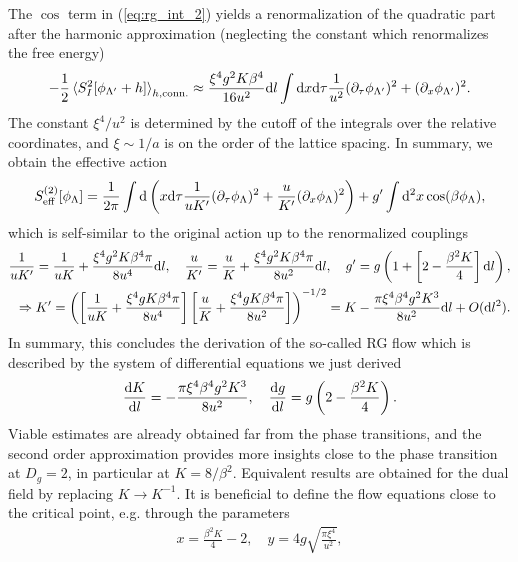 The $\cos$ term in (\cref{eq:rg_int_2}) yields a renormalization of the quadratic part after the harmonic approximation (neglecting the constant which renormalizes the free energy)
\begin{align}
    -\frac12\braket{S^2_I[\phi_{\Lambda'}+h]}_{h,{\rm conn.}}
    \approx
    \frac{\xi^4 g^2K\beta^4}{16u^2}\mathrm d l\int\mathrm d x\mathrm d\tau\frac1{u^2}(\partial_
    \tau\phi_{\Lambda'})^2+(\partial_x\phi_{\Lambda'})^2.
    \label{eq:RG_second_order_approximation}
\end{align}
The constant $\xi^4/u^2$ is determined by the cutoff of the integrals over the relative coordinates, and $\xi\sim1/a$ is on the order of the lattice spacing.
In summary, we obtain the effective action
\begin{align}
    S_{\rm eff}^{(2)}[\phi_\Lambda] = \frac1{2\pi}\int\mathrm d\left(  x\mathrm d\tau\frac{1}{uK'}(\partial_\tau\phi_\Lambda)^2 + \frac{u}{K'}(\partial_x\phi_\Lambda)^2 \right) +  g'\int\mathrm d^2 x\cos(\beta\phi_\Lambda),
\end{align}
which is self-similar to the original action up to the renormalized couplings
\begin{align}
    \frac1{uK'}=\frac1{uK}+\frac{\xi^4 g^2 K\beta^4\pi}{8 u^4}\mathrm d l,
    \quad
    \frac u{K'}=\frac u{K}+\frac{\xi^4 g^2 K\beta^4\pi}{8u^2}\mathrm d l,
    \quad
    g' = g\left( 1 + \left[ 2-\frac{\beta^2 K}4 \right]\mathrm d l \right),
    \\
    \Rightarrow
    K' = \left( \left[ \frac{1}{uK}+\frac{\xi^4 g K\beta^4\pi}{8u^4} \right]\left[ \frac{u}{K}+\frac{\xi^4 g K\beta^4\pi}{8u^2} \right] \right)^{-1/2}
    =
    K-\frac{\pi \xi^4 \beta^4 g^2 K^3}{8u^2}\mathrm d l + O(\mathrm d l^2).
\end{align}
In summary, this concludes the derivation of the so-called RG flow which is described by the system of differential equations we just derived
\begin{align}
    \frac{\mathrm d K}{\mathrm d l} = -\frac{\pi \xi^4 \beta^4 g^2 K^3}{8u^2},
    \quad
    \frac{\mathrm d g}{\mathrm d l} = g\left( 2-\frac{\beta^2K}4 \right).
\end{align}
Viable estimates are already obtained far from the phase transitions, and the second order approximation provides more insights close to the phase transition at $D_g=2$, in particular at $K=8/\beta^2$.
Equivalent results are obtained for the dual field by replacing $K\rightarrow K^{-1}$.
It is beneficial to define the flow equations close to the critical point, e.g. through the parameters
\begin{align}
    x = \frac{\beta^2 K}4 - 2,
    \quad
    y = 4g\sqrt{\frac{\pi\xi^4}{u^2}},
\end{align}
